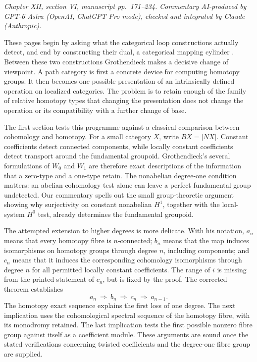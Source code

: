 \noindent\textit{Chapter XII, section VI, manuscript pp.~171--234. Commentary AI-produced by GPT-6 Astra (OpenAI, ChatGPT Pro mode), checked and integrated by Claude (Anthropic).}

These pages begin by asking what the categorical loop constructions actually detect, and end by constructing their dual, a categorical mapping cylinder \citep[manuscript pp.~171--234]{Grothendieck1990XIIc}. Between these two constructions Grothendieck makes a decisive change of viewpoint. A path category is first a concrete device for computing homotopy groups. It then becomes one possible presentation of an intrinsically defined operation on localized categories. The problem is to retain enough of the family of relative homotopy types that changing the presentation does not change the operation or its compatibility with a further change of base.

The first section tests this programme against a classical comparison between cohomology and homotopy. For a small category $X$, write $BX=|NX|$. Constant coefficients detect connected components, while locally constant coefficients detect transport around the fundamental groupoid. Grothendieck's several formulations of $W_0$ and $W_1$ are therefore exact descriptions of the information that a zero-type and a one-type retain. The nonabelian degree-one condition matters: an abelian cohomology test alone can leave a perfect fundamental group undetected. Our commentary spells out the small group-theoretic argument showing why surjectivity on constant nonabelian $H^1$, together with the local-system $H^0$ test, already determines the fundamental groupoid.

The attempted extension to higher degrees is more delicate. With his notation, $a_n$ means that every homotopy fibre is $n$-connected; $b_n$ means that the map induces isomorphisms on homotopy groups through degree $n$, including components; and $c_n$ means that it induces the corresponding cohomology isomorphisms through degree $n$ for all permitted locally constant coefficients. The range of $i$ is missing from the printed statement of $c_n$, but is fixed by the proof. The corrected theorem establishes
\[
 a_n\ \Longrightarrow\ b_n\ \Longrightarrow\ c_n\
 \Longrightarrow\ a_{n-1}.
\]
The homotopy exact sequence explains the first loss of one degree. The next implication uses the cohomological spectral sequence of the homotopy fibre, with its monodromy retained. The last implication tests the first possible nonzero fibre group against itself as a coefficient module. These arguments are sound once the stated verifications concerning twisted coefficients and the degree-one fibre group are supplied.


